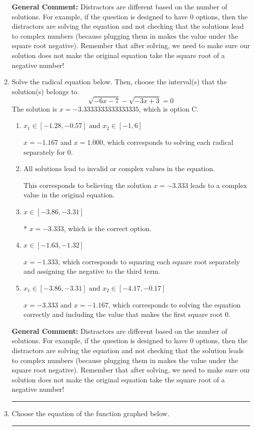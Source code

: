 \documentclass{extbook}[14pt]
\newcommand{\litem}[1]{\item #1

\rule{\textwidth}{0.4pt}}
\begin{document}
\begin{enumerate}
{\textbf{General Comment:} Distractors are different based on the number of solutions. For example, if the question is designed to have 0 options, then the distractors are solving the equation and not checking that the solutions lead to complex numbers (because plugging them in makes the value under the square root negative). Remember that after solving, we need to make sure our solution does not make the original equation take the square root of a negative number!
}
\litem{
Solve the radical equation below. Then, choose the interval(s) that the solution(s) belongs to.
\[ \sqrt{-6 x - 7} - \sqrt{-3 x + 3} = 0 \]The solution is \( x = -3.3333333333333335 \), which is option C.\begin{enumerate}[label=\Alph*.]
\item \( x_1 \in [-1.28, -0.57] \text{ and } x_2 \in [-1,6] \)

$x = -1.167$ and $x = 1.000$, which corresponds to solving each radical separately for 0.
\item \( \text{All solutions lead to invalid or complex values in the equation.} \)

This corresponds to believing the solution $x = -3.333$ leads to a complex value in the original equation.
\item \( x \in [-3.86,-3.31] \)

* $x = -3.333$, which is the correct option.
\item \( x \in [-1.63,-1.32] \)

$x = -1.333$, which corresponds to squaring each square root separately and assigning the negative to the third term.
\item \( x_1 \in [-3.86, -3.31] \text{ and } x_2 \in [-4.17,-0.17] \)

$x = -3.333$ and $x = -1.167$, which corresponds to solving the equation correctly and including the value that makes the first square root 0.
\end{enumerate}

\textbf{General Comment:} Distractors are different based on the number of solutions. For example, if the question is designed to have 0 options, then the distractors are solving the equation and not checking that the solution leads to complex numbers (because plugging them in makes the value under the square root negative). Remember that after solving, we need to make sure our solution does not make the original equation take the square root of a negative number!
}
\litem{
Choose the equation of the function graphed below.

}
\end{enumerate}
\end{document}
